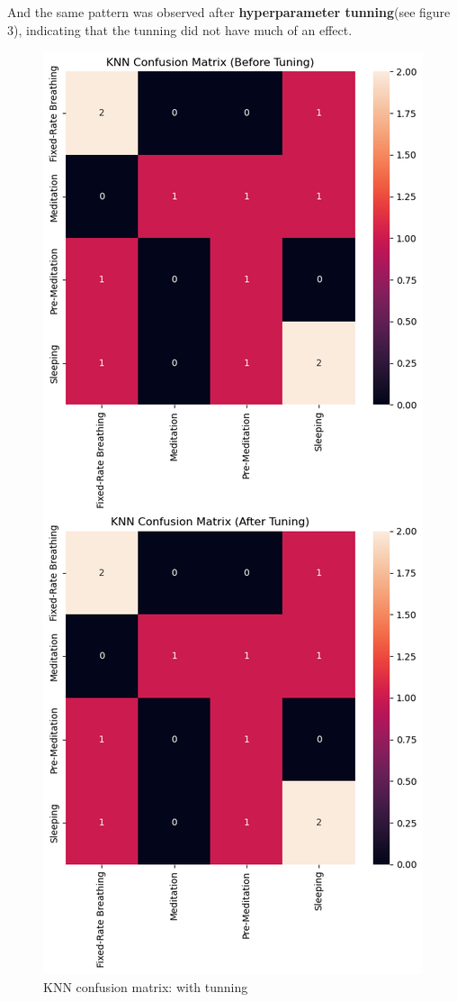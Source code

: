 \documentclass[
  11pt,
]{ieee}
\begin{document}
And the same pattern was observed after \textbf{hyperparameter
tunning}(see figure 3), indicating that the tunning did not have much of
an effect.

\begin{figure}

{\centering \includegraphics{picture_use_ml/3_KNN Confusion Matrix_Before vs After Tuning.png}

}

\caption{KNN confusion matrix: with tunning}

\end{figure}%
\end{document}
